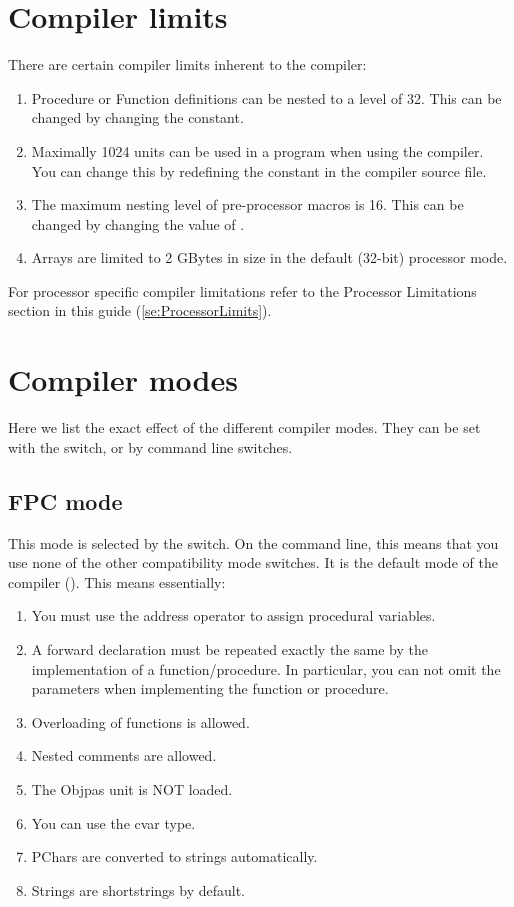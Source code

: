 \chapter{Compiler limits}
\label{ch:AppC}
There are certain compiler limits inherent to the compiler:
\begin{enumerate}
\item Procedure or Function definitions can be nested to a level of 32. This
can be changed by changing the  constant.
\item Maximally 1024 units can be used in a program when using the compiler.
You can change this by redefining the  constant in the compiler 
source file.
\item The maximum nesting level of pre-processor macros is 16. This can be
changed by changing the value of .
\item Arrays are limited to 2 GBytes in size in the default (32-bit) 
processor mode.
\end{enumerate}

For processor specific compiler limitations refer to the Processor
Limitations section in this guide (\ref{se:ProcessorLimits}).

\chapter{Compiler modes}
\label{ch:AppD}

Here we list the exact effect of the different compiler modes. They can be
set with the  switch, or by command line switches.

\section{FPC mode}
This mode is selected by the  switch. On the command line,
this means that you use none of the other compatibility mode switches.
It is the default mode of the compiler (). This means essentially:
\begin{enumerate}
\item You must use the address operator to assign procedural variables.
\item A forward declaration must be repeated exactly the same by the
implementation of a function/procedure. In particular, you can not omit the
parameters when implementing the function or procedure.
\item Overloading of functions is allowed.
\item Nested comments are allowed.
\item The Objpas unit is NOT loaded.
\item You can use the cvar type.
\item PChars are converted to strings automatically.
\item Strings are shortstrings by default.
\end{enumerate}


